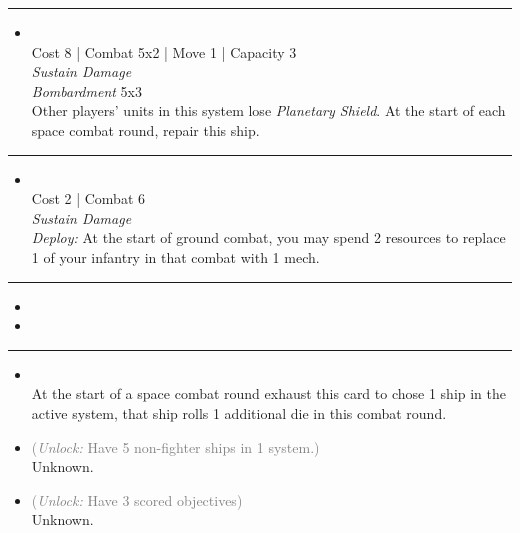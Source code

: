 \begin{multicols}{2}
\vspace{-10pt}\rule{\hsize}{0.4pt}\vspace{5pt}


\begin{itemize}
\item {}\\
Cost 8 | Combat 5x2 | Move 1 | Capacity 3 \\
\emph{Sustain Damage}\\
\emph{Bombardment} 5x3\\
Other players' units in this system lose \emph{Planetary Shield}. At the start of each space combat round, repair this ship.
\end{itemize}

\vspace{-10pt}\rule{\hsize}{0.4pt}\vspace{5pt}


\begin{itemize}
\item {}
\\
Cost 2 | Combat 6 \\
\emph{Sustain Damage}\\
\emph{Deploy:} At the start of ground combat, you may spend 2 resources to replace 1 of your infantry in that combat with 1 mech.
\end{itemize}

\vspace{-10pt}\rule{\hsize}{0.4pt}\vspace{5pt}

\nounits

\columnbreak
{}

\begin{itemize}
\item \disruptors
\item \NES
\end{itemize}

\vspace{-10pt}\rule{\hsize}{0.4pt}\vspace{5pt}


\begin{itemize}
\item {}\\
At the start of a space combat round exhaust this card to chose 1 ship in the active system, that ship rolls 1 additional die in this combat round.
\item {} \textcolor{gray}{(\emph{Unlock:} Have 5 non-fighter ships in 1 system.)}\\
Unknown.
\item {} \textcolor{gray}{(\emph{Unlock:} Have 3 scored objectives)}\\
Unknown.
\end{itemize}


\end{multicols}

